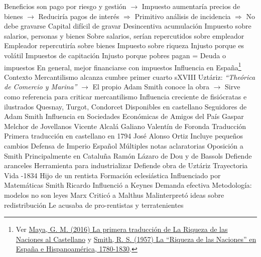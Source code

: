 \documentclass{nuevotema}
\begin{document}
\begin{esquemal}
				\4[] Beneficios son pago por riesgo y gestión
				\4[] $\to$ Impuesto aumentaría precios de bienes
				\4[] $\to$ Reduciría pagos de interés
				\4[] $\Rightarrow$ Primitivo análisis de incidencia
				\4[] $\Rightarrow$ No debe gravarse
				\4[] Capital difícil de gravar
				\4[] Desincentiva acumulación
				\4 Impuesto sobre salarios, personas y bienes
				\4[] Sobre salarios, serían repercutidos sobre empleador
				\4[] Empleador repercutiría sobre bienes
				\4 Impuesto sobre riqueza
				\4[] Injusto porque es volátil
				\4 Impuestos de capitación
				\4[] Injusto porque pobres pagan =
				\4 Deuda o impuestos
				\4[] En general, mejor financiarse con impuestos
		\2 Influencia en España\footnote{Ver \href{https://www.elmundo.com/portal/opinion/columnistas/la_primera_traduccion_de_la_riqueza__de_las_naciones_al_castellano.php}{Maya, G. M. (2016) La primera traducción de La Riqueza de las Naciones al Castellano} y \href{http://www.cepc.gob.es/Controls/Mav/getData.ashx?MAVqs=~aWQ9MzE0OTYmaWRlPTEwMzcmdXJsPTExJm5hbWU9UkVDUF8wMTlfMjIxLnBkZiZmaWxlPVJFQ1BfMDE5XzIyMS5wZGYmdGFibGE9QXJ0aWN1bG8mY29udGVudD1hcHBsaWNhdGlvbi9wZGY=}{Smith, R. S. (1957) La ``Riqueza de las Naciones'' en España e Hispanoamérica, 1780-1830}.}
			\3 Contexto
				\4 Mercantilismo alcanza cumbre primer cuarto sXVIII
				\4[] Uztáriz: \textit{``Theórica de Comercio y Marina''}
				\4[] $\to$ El propio Adam Smith conoce la obra
				\4[] $\to$ Sirve como referencia para criticar mercantilismo
				\4 Influencia creciente de fisiócratas e ilustrados
				\4[] Quesnay, Turgot, Condorcet
				\4[] Disponibles en castellano
			\3 Seguidores de Adam Smith
				\4 Influencia en Sociedades Económicas de Amigos del País
				\4 Gaspar Melchor de Jovellanos
				\4 Vicente Alcalá Galiano
				\4 Valentín de Foronda
			\3 Traducción
				\4 Primera traducción en castellano en 1794
				\4[] José Alonso Ortiz
				\4 Incluye pequeños cambios
				\4[] Defensa de Imperio Español
				\4[] Múltiples notas aclaratorias
			\3 Oposición a Smith
				\4 Principalmente en Cataluña
				\4 Ramón Lázaro de Dou y de Bassols
				\4 Defiende aranceles
				\4[] Herramienta para industrializar
				\4[] Defiende obra de Uztáriz
	\1 
		\2 Trayectoria
			\3 Vida
				-1834
				\4 Hijo de un rentista
				\4 Formación eclesiástica
			\3 Influenciado por
				\4 Matemáticas
				\4 Smith
				\4 Ricardo
			\3 Influenció a
				\4 Keynes
				\4[] Demanda efectiva
				\4[] Metodología: modelos no son leyes
				\4 Marx
				\4[] Criticó a Malthus
				\4[] Malinterpretó ideas sobre redistribución
				\4[] Le acusaba de pro-rentistas y terratenientes

\end{esquemal}
\end{document}
